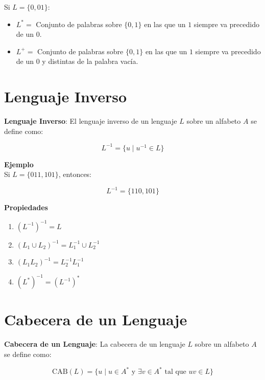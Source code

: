 \documentclass[12pt]{report} %
\providecommand{\tightlist}{%
  \setlength{\itemsep}{0pt}\setlength{\parskip}{0pt}}
\begin{document}
\begin{ejemplo}
Si $L = \{0, 01\}$:  
    \begin{itemize}
        \item $L^* =$ Conjunto de palabras sobre $\{0, 1\}$ en las que un $1$ siempre va precedido de un $0$.  
        \item $L^+ =$ Conjunto de palabras sobre $\{0, 1\}$ en las que un $1$ siempre va precedido de un $0$ y distintas de la palabra vacía.  
    \end{itemize}
\end{ejemplo}

\hypertarget{lenguaje-inverso}{%
\section{Lenguaje Inverso}\label{lenguaje-inverso}}

\begin{definicion}
\textbf{Lenguaje Inverso}: El lenguaje inverso de un lenguaje $L$ sobre un alfabeto $A$ se define como:

$$
L^{-1} = \{u \mid u^{-1} \in L\}
$$
\end{definicion}

\textbf{Ejemplo}\\
Si \(L = \{011, 101\}\), entonces:

\[
L^{-1} = \{110, 101\}
\]

\textbf{Propiedades}

\begin{enumerate}
\def\labelenumi{\arabic{enumi}.}
\tightlist
\item
  \((L^{-1})^{-1} = L\)\\
\item
  \((L_1 \cup L_2)^{-1} = L_1^{-1} \cup L_2^{-1}\)\\
\item
  \((L_1L_2)^{-1} = L_2^{-1}L_1^{-1}\)\\
\item
  \((L^*)^{-1} = (L^{-1})^*\)
\end{enumerate}

\hypertarget{cabecera-de-un-lenguaje}{%
\section{Cabecera de un Lenguaje}\label{cabecera-de-un-lenguaje}}

\begin{definicion}
\textbf{Cabecera de un Lenguaje}: La cabecera de un lenguaje $L$ sobre un alfabeto $A$ se define como:

$$
\text{CAB}(L) = \{u \mid u \in A^* \text{ y } \exists v \in A^* \text{ tal que } uv \in L\}
$$
\end{definicion}
\end{document}
